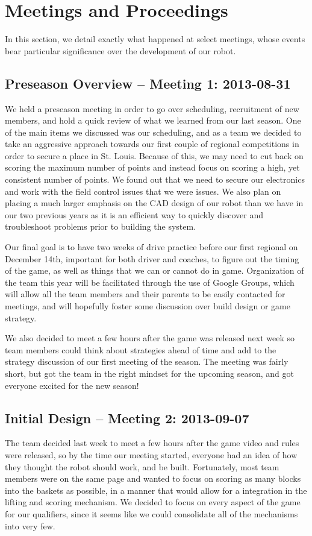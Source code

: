 \section{Meetings and Proceedings}
In this section, we detail exactly what happened at select meetings, whose events bear particular significance over the development of our robot.

\subsection{Preseason Overview -- Meeting 1: 2013-08-31}
We held a preseason meeting in order to go over scheduling, recruitment of new members, and hold a quick review of what we learned from our last season. One of the main items we discussed was our scheduling, and as a team we decided to take an aggressive approach towards our first couple of regional competitions in order to secure a place in St. Louis. Because of this, we may need to cut back on scoring the maximum number of points and instead focus on scoring a high, yet consistent number of points. We found out that we need to secure our electronics and work with the field control issues that we were issues. We also plan on placing a much larger emphasis on the CAD design of our robot than we have in our two previous years as it is an efficient way to quickly discover and troubleshoot problems prior to building the system. 

Our final goal is to have two weeks of drive practice before our first regional on December 14th, important for both driver and coaches, to figure out the timing of the game, as well as things that we can or cannot do in game. Organization of the team this year will be facilitated through the use of Google Groups, which will allow all the team members and their parents to be easily contacted for meetings, and will hopefully foster some discussion over build design or game strategy. 

We also decided to meet a few hours after the game was released next week so team members could think about strategies ahead of time and add to the strategy discussion of our first meeting of the season. The meeting was fairly short, but got the team in the right mindset for the upcoming season, and got everyone excited for the  new season!

\newpage \subsection{Initial Design -- Meeting 2: 2013-09-07}
The team decided last week to meet a few hours after the game video and rules were released, so by the time our meeting started, everyone had an idea of how they thought the robot should work, and be built. Fortunately, most team members were on the same page and wanted to focus on scoring as many blocks into the baskets as possible, in a manner that would allow for a integration in the lifting and scoring mechanism. We decided to focus on every aspect of the game for our qualifiers, since it seems like we could consolidate all of the mechanisms into very few.

